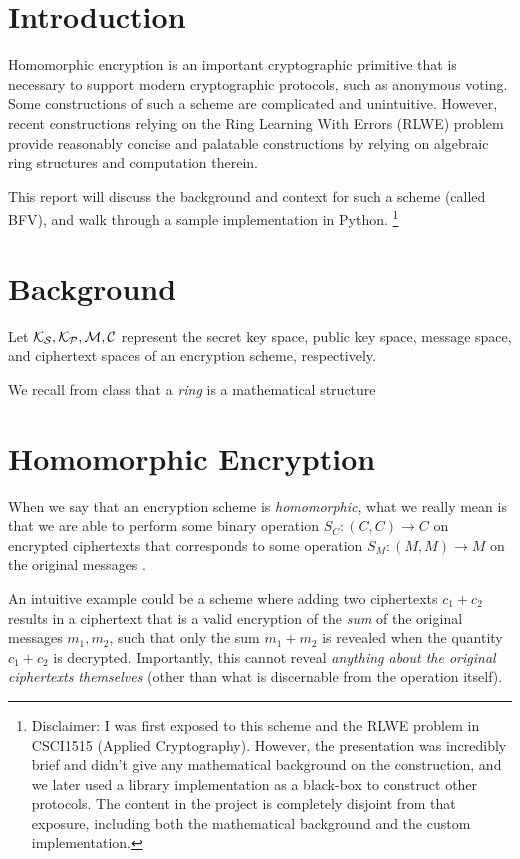 \documentclass{theme}
\begin{document}
\section{Introduction}

Homomorphic encryption is an important cryptographic primitive that is necessary to support modern cryptographic protocols, such as anonymous voting. Some constructions of such a scheme are complicated and unintuitive. However, recent constructions relying on the Ring Learning With Errors (RLWE) problem provide reasonably concise and palatable constructions by relying on algebraic ring structures and computation therein.

This report will discuss the background and context for such a scheme (called BFV), and walk through a sample implementation in Python.
\footnote{Disclaimer: I was first exposed to this scheme and the RLWE problem in CSCI1515 (Applied Cryptography). However, the presentation was incredibly brief and didn't give any mathematical background on the construction, and we later used a library implementation as a black-box to construct other protocols. The content in the project is completely disjoint from that exposure, including both the mathematical background and the custom implementation.}

\section{Background}

Let $\mathcal{K_S}, \mathcal{K_P}, \mathcal{M}, \mathcal{C}$ represent the secret key space, public key space, message space, and ciphertext spaces of an encryption scheme, respectively.

We recall from class that a \textit{ring} is a mathematical structure

\section{Homomorphic Encryption}

When we say that an encryption scheme is \textit{homomorphic}, what we really mean is that we are able to perform some binary operation $S_C: (C,C) \to C$ on encrypted ciphertexts that corresponds to some operation $S_M: (M, M) \to M$ on the original messages \cite{fhe}.

An intuitive example could be a scheme where adding two ciphertexts $c_1 + c_2$ results in a ciphertext that is a valid encryption of the \textit{sum} of the original messages $m_1,m_2$, such that only the sum $m_1 + m_2$ is revealed when the quantity $c_1 + c_2$ is decrypted. Importantly, this cannot reveal \textit{anything about the original ciphertexts themselves} (other than what is discernable from the operation itself).
\end{document}

